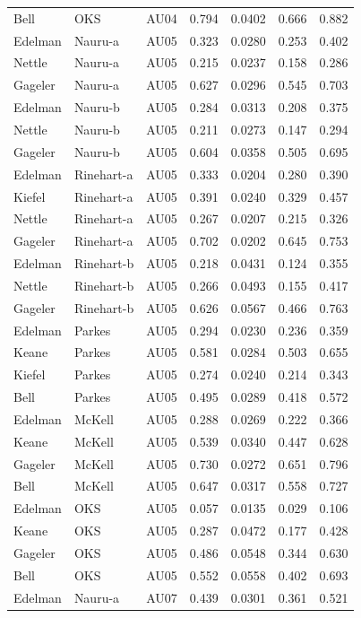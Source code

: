 \documentclass{monashthesis}
\begin{document}
\begin{center}
\begin{longtable}{lllllll}
Bell & OKS & AU04 & 0.794 & 0.0402 & 0.666 & 0.882 \\
Edelman & Nauru-a & AU05 & 0.323 & 0.0280 & 0.253 & 0.402 \\
Nettle & Nauru-a & AU05 & 0.215 & 0.0237 & 0.158 & 0.286 \\
Gageler & Nauru-a & AU05 & 0.627 & 0.0296 & 0.545 & 0.703 \\
Edelman & Nauru-b & AU05 & 0.284 & 0.0313 & 0.208 & 0.375 \\
Nettle & Nauru-b & AU05 & 0.211 & 0.0273 & 0.147 & 0.294 \\
Gageler & Nauru-b & AU05 & 0.604 & 0.0358 & 0.505 & 0.695 \\
Edelman & Rinehart-a & AU05 & 0.333 & 0.0204 & 0.280 & 0.390 \\
Kiefel & Rinehart-a & AU05 & 0.391 & 0.0240 & 0.329 & 0.457 \\
Nettle & Rinehart-a & AU05 & 0.267 & 0.0207 & 0.215 & 0.326 \\
Gageler & Rinehart-a & AU05 & 0.702 & 0.0202 & 0.645 & 0.753 \\
Edelman & Rinehart-b & AU05 & 0.218 & 0.0431 & 0.124 & 0.355 \\
Nettle & Rinehart-b & AU05 & 0.266 & 0.0493 & 0.155 & 0.417 \\
Gageler & Rinehart-b & AU05 & 0.626 & 0.0567 & 0.466 & 0.763 \\
Edelman & Parkes & AU05 & 0.294 & 0.0230 & 0.236 & 0.359 \\
Keane & Parkes & AU05 & 0.581 & 0.0284 & 0.503 & 0.655 \\
Kiefel & Parkes & AU05 & 0.274 & 0.0240 & 0.214 & 0.343 \\
Bell & Parkes & AU05 & 0.495 & 0.0289 & 0.418 & 0.572 \\
Edelman & McKell & AU05 & 0.288 & 0.0269 & 0.222 & 0.366 \\
Keane & McKell & AU05 & 0.539 & 0.0340 & 0.447 & 0.628 \\
Gageler & McKell & AU05 & 0.730 & 0.0272 & 0.651 & 0.796 \\
Bell & McKell & AU05 & 0.647 & 0.0317 & 0.558 & 0.727 \\
Edelman & OKS & AU05 & 0.057 & 0.0135 & 0.029 & 0.106 \\
Keane & OKS & AU05 & 0.287 & 0.0472 & 0.177 & 0.428 \\
Gageler & OKS & AU05 & 0.486 & 0.0548 & 0.344 & 0.630 \\
Bell & OKS & AU05 & 0.552 & 0.0558 & 0.402 & 0.693 \\
Edelman & Nauru-a & AU07 & 0.439 & 0.0301 & 0.361 & 0.521 \\

\end{longtable}
\end{center}
\end{document}
